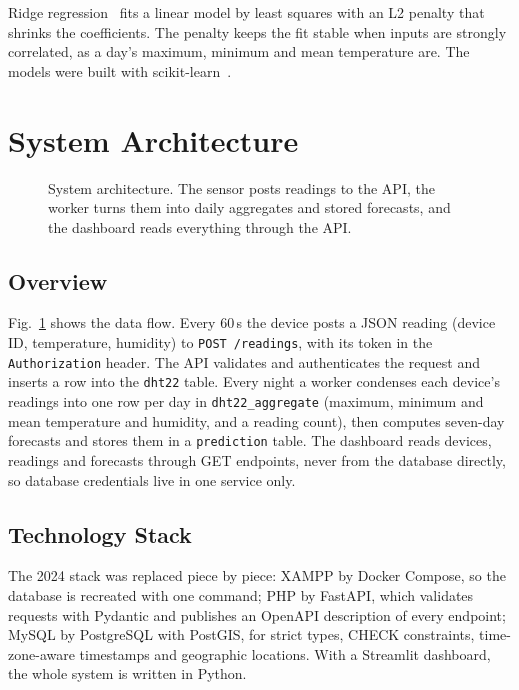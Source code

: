 \documentclass[conference]{IEEEtran}
\newcommand{\figplaceholder}[2]{%
  \fbox{\parbox[c][#2][c]{0.92\columnwidth}{\centering\small\textcolor{red}{#1}}}}
\begin{document}
Ridge regression~\cite{b9} fits a linear model by least squares with an L2 penalty that shrinks the coefficients. The penalty keeps the fit stable when inputs are strongly correlated, as a day's maximum, minimum and mean temperature are. The models were built with scikit-learn~\cite{b10}.

\section{System Architecture}
\label{sec:arch}

\begin{figure}[t]
\centering
\figplaceholder{Insert architecture diagram: ESP8266 + DHT22 $\rightarrow$ FastAPI $\rightarrow$ PostgreSQL $\leftarrow$ worker (aggregator, predictor, scheduler); Streamlit dashboard $\rightarrow$ FastAPI}{4cm}
\caption{System architecture. The sensor posts readings to the API, the worker turns them into daily aggregates and stored forecasts, and the dashboard reads everything through the API.}
\label{fig:arch}
\end{figure}

\subsection{Overview}
Fig.~\ref{fig:arch} shows the data flow. Every 60\,s the device posts a JSON reading (device ID, temperature, humidity) to \texttt{POST /readings}, with its token in the \texttt{Authorization} header. The API validates and authenticates the request and inserts a row into the \texttt{dht22} table. Every night a worker condenses each device's readings into one row per day in \texttt{dht22\_aggregate} (maximum, minimum and mean temperature and humidity, and a reading count), then computes seven-day forecasts and stores them in a \texttt{prediction} table. The dashboard reads devices, readings and forecasts through GET endpoints, never from the database directly, so database credentials live in one service only.

\subsection{Technology Stack}
The 2024 stack was replaced piece by piece: XAMPP by Docker Compose, so the database is recreated with one command; PHP by FastAPI, which validates requests with Pydantic and publishes an OpenAPI description of every endpoint; MySQL by PostgreSQL with PostGIS, for strict types, CHECK constraints, time-zone-aware timestamps and geographic locations. With a Streamlit dashboard, the whole system is written in Python.
\end{document}
